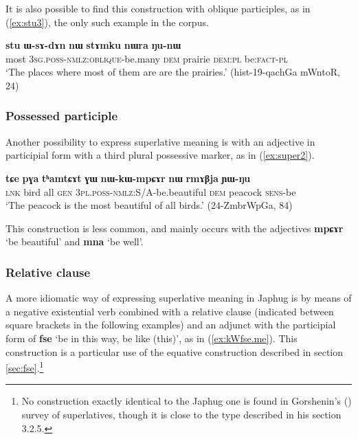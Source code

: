 \documentclass[oneside,a4paper,11pt]{article}
\newcommand{\ipa}[1]{{\phon\textbf{#1}}}
\newcommand{\forme}[2]{\ipa{#1} `#2'}
\begin{document}
It is also possible to find this construction with oblique participles, as in (\ref{ex:stu3}), the only such example in the corpus.

\begin{exe}
\ex \label{ex:stu3}
\gll 
\ipa{stu} 	\ipa{ɯ-sɤ-dɤn} 	\ipa{nɯ} 	\ipa{stɤmku} 	\ipa{nɯra} 	\ipa{ŋu-nɯ} \\
most \textsc{3sg.poss-nmlz:oblique}-be.many \textsc{dem} prairie \textsc{dem:pl} be:\textsc{fact-pl} \\
\glt `The places where most of them are are the prairies.' (hist-19-qachGa mWntoR, 24)
\end{exe}

 \subsubsection{Possessed participle}
Another possibility to express superlative meaning is with an adjective in participial form  with a third plural possessive marker, as in (\ref{ex:super2}). 
 
 \begin{exe}
\ex \label{ex:super2}
\gll 
\ipa{tɕe} 	\ipa{pɣa} 	\ipa{tʰamtɕɤt} 	\ipa{ɣɯ} 	\ipa{nɯ-kɯ-mpɕɤr} 	\ipa{nɯ} 	\ipa{rmɤβja} 	\ipa{ɲɯ-ŋu} \\
\textsc{lnk} bird all \textsc{gen} \textsc{3pl.poss-nmlz}:S/A-be.beautiful \textsc{dem} peacock \textsc{sens}-be \\
\glt  `The peacock is the most beautiful of all birds.' (24-ZmbrWpGa, 84)
\end{exe}

This construction is less common, and mainly occurs with the adjectives \forme{mpɕɤr}{be beautiful} and \forme{mna}{be well}.

 \subsubsection{Relative clause} \label{sec:relative.superlative}
 A more idiomatic way of expressing superlative meaning in Japhug is by means of a negative existential verb combined with a relative clause (indicated between square brackets in the following examples) and an adjunct with the participial form of \forme{fse}{be in this way, be like (this)}, as in (\ref{ex:kWfse.me}). This construction is a particular use of the equative construction described in section \ref{sec:fse}.\footnote{No construction exactly identical to the Japhug one is found in Gorshenin's (\citeyear{gorshenin12superlative}) survey of superlatives, though it is close to the type described in his section 3.2.5.}
 
\end{document}
